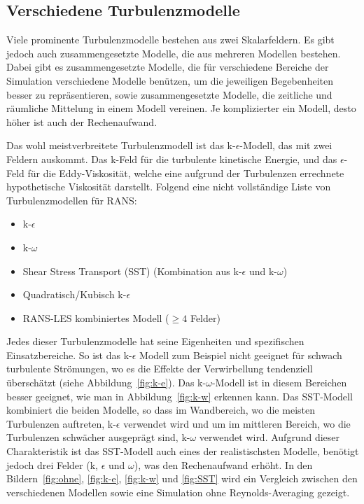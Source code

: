 \subsection{Verschiedene Turbulenzmodelle}

Viele prominente Turbulenzmodelle bestehen aus zwei Skalarfeldern.
Es gibt jedoch auch zusammengesetzte Modelle, die aus mehreren Modellen bestehen.
Dabei gibt es zusammengesetzte Modelle, die für verschiedene Bereiche der Simulation verschiedene Modelle benützen,
um die jeweiligen Begebenheiten besser zu repräsentieren,
sowie zusammengesetzte Modelle, die zeitliche und räumliche Mittelung in einem Modell vereinen.
Je komplizierter ein Modell, desto höher ist auch der Rechenaufwand.

Das wohl meistverbreitete Turbulenzmodell ist das k-$\epsilon$-Modell, das mit zwei Feldern auskommt. Das k-Feld für die
%
turbulente kinetische Energie, und das $\epsilon$-Feld für die Eddy-Viskosität, welche eine aufgrund der Turbulenzen errechnete
%
hypothetische Viskosität darstellt.
Folgend eine nicht vollständige Liste von Turbulenzmodellen für RANS:

\begin{itemize}
    \item k-$\epsilon$
    \item k-$\omega$
%
    \item Shear Stress Transport (SST) (Kombination aus k-$\epsilon$ und k-$\omega$)
%
%
    \item Quadratisch/Kubisch k-$\epsilon$
    \item RANS-LES kombiniertes Modell ($\ge 4$ Felder)
%
\end{itemize}

Jedes dieser Turbulenzmodelle hat seine Eigenheiten und spezifischen Einsatzbereiche.
So ist das k-$\epsilon$ Modell zum Beispiel nicht geeignet für schwach turbulente Strömungen,
wo es die Effekte der Verwirbellung tendenziell überschätzt (siehe Abbildung~\ref{fig:k-e}).
Das k-$\omega$-Modell ist in diesem Bereichen besser geeignet, wie man in Abbildung~\ref{fig:k-w}
erkennen kann. Das SST-Modell kombiniert die beiden Modelle, so dass im Wandbereich,
wo die meisten Turbulenzen auftreten, k-$\epsilon$ verwendet wird und um im mittleren Bereich,
wo die Turbulenzen schwächer ausgeprägt sind, k-$\omega$ verwendet wird.
Aufgrund dieser Charakteristik ist das SST-Modell auch eines der realistischsten Modelle,
benötigt jedoch drei Felder (k, $\epsilon$ und $\omega$), was den Rechenaufwand erhöht.
In den Bildern~\ref{fig:ohne}, \ref{fig:k-e}, \ref{fig:k-w} und \ref{fig:SST}
wird ein Vergleich zwischen den verschiedenen Modellen sowie eine Simulation ohne
Reynolds-Averaging gezeigt.

